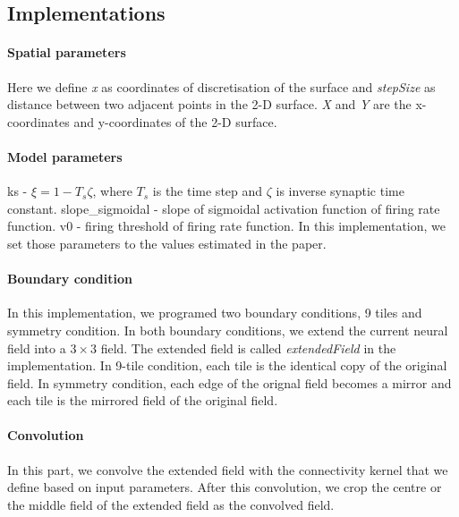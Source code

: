 \documentclass[a4paper, 12pt, english]{article}
\begin{document}
\subsection{Implementations}

\paragraph{Spatial parameters\newline}
Here we define \textit{x} as coordinates of discretisation of the surface and
\textit{stepSize} as distance between two adjacent points in the 2-D surface.
\textit{X} and \textit{Y} are the x-coordinates and y-coordinates of the 2-D surface.


\paragraph{Model parameters\newline}
ks - $\xi = 1 - T_s\zeta $, where $T_s$ is the time step and $\zeta $ is inverse synaptic time constant. \newline
slope\_sigmoidal - slope of sigmoidal activation function of firing rate function.\newline
v0 - firing threshold of firing rate function.\newline
In this implementation, we set those parameters to the values estimated in the paper.

\paragraph{Boundary condition\newline}
In this implementation, we programed two boundary conditions, 9 tiles and symmetry condition.
In both boundary conditions, we extend the current neural field into a $3\times3 $ field.
The extended field is called \textit{extendedField} in the implementation.
In 9-tile condition, each tile is the identical copy of the original field.
In symmetry condition, each edge of the orignal field becomes a mirror and
each tile is the mirrored field of the original field.

\paragraph{Convolution\newline}
In this part, we convolve the extended field with the connectivity kernel
that we define based on input parameters. After this convolution, we crop the
centre or the middle field of the extended field as the convolved field.\par
\end{document}
